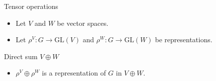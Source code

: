 \documentclass[10pt]{beamer}
\newcommand{\GL}{\text{GL}}
\begin{document}
	\begin{frame}{Tensor operations}
		
\begin{itemize}
	\item 		Let $V$ and $W$ be vector spaces.
		
		
		\item Let $\rho^V: G \rightarrow \GL(V)$ and $\rho^W: G \rightarrow \GL(W)$ be representations.
\end{itemize}\pause

		\begin{block}{Direct sum $V \oplus W$}
			\begin{itemize}
%				
%				
%				
				\item $\rho^V \oplus \rho^W$ is a representation of $G$ in $V \oplus W$.
			\end{itemize}
		\end{block}\pause
		

\end{frame}
\end{document}
